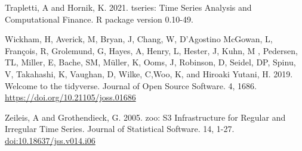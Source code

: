 \documentclass[
  12pt,
]{article}
\begin{document}
Trapletti, A and Hornik, K. 2021. tseries: Time Series Analysis and
Computational Finance. R package version 0.10-49.

Wickham, H, Averick, M, Bryan, J, Chang, W, D'Agostino McGowan, L,
François, R, Grolemund, G, Hayes, A, Henry, L, Hester, J, Kuhn, M ,
Pedersen, TL, Miller, E, Bache, SM, Müller, K, Ooms, J, Robinson, D,
Seidel, DP, Spinu, V, Takahashi, K, Vaughan, D, Wilke, C,Woo, K, and
Hiroaki Yutani, H. 2019. Welcome to the tidyverse. Journal of Open
Source Software. 4, 1686. \url{https://doi.org/10.21105/joss.01686}

Zeileis, A and Grothendieck, G. 2005. zoo: S3 Infrastructure for Regular
and Irregular Time Series. Journal of Statistical Software. 14, 1-27.
\url{doi:10.18637/jss.v014.i06}
\end{document}
